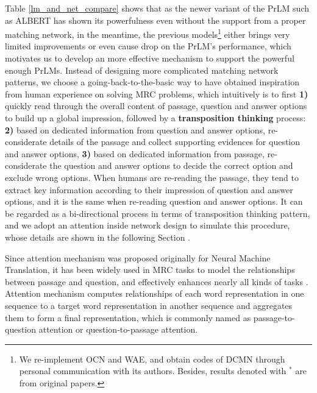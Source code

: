 \documentclass[letterpaper]{article} \usepackage{aaai21}  \usepackage{times}  \usepackage{helvet} \usepackage{courier}  \usepackage[hyphens]{url}  \usepackage{graphicx} \urlstyle{rm} \def\UrlFont{\rm}  \usepackage{natbib}  \usepackage{caption} \frenchspacing  \setlength{\pdfpagewidth}{8.5in}  \setlength{\pdfpageheight}{11in}
\begin{document}
Table \ref{lm_and_net_compare} shows that as the newer variant of the PrLM such as ALBERT \cite{albert} has shown its powerfulness even without the support from a proper matching network, in the meantime, the previous models\footnote{We re-implement OCN and WAE, and obtain codes of DCMN through personal communication with its authors. Besides, results denoted with $^*$ are from original papers.} \cite{ocn, bert_wae, dcmn} either brings very limited improvements or even cause drop on the PrLM's \cite{bert, xlnet, albert, clark2020electra} performance, which motivates us to develop an more effective mechanism to support the powerful enough PrLMs. Instead of designing more complicated matching network patterns, we choose a going-back-to-the-basic way to have obtained inspiration from human experience on solving MRC problems, which intuitively is to first \textbf{1)} quickly read through the overall content of passage, question and answer options to build up a global impression, followed by a \textbf{transposition thinking} process: \textbf{2)} based on dedicated information from question and answer options, re-considerate details of the passage and collect supporting evidences for question and answer options, \textbf{3)} based on dedicated information from passage, re-considerate the question and answer options to decide the correct option and exclude wrong options. When humans are re-reading the passage, they tend to extract key information according to their impression of question and answer options, and it is the same when re-reading question and answer options. It can be regarded as a bi-directional process in terms of transposition thinking pattern, and we adopt an attention inside network design to simulate this procedure, whose details are shown in the following Section \textit{}.

Since attention mechanism was proposed \cite{nmt_attention} originally for Neural Machine Translation, it has been widely used in MRC tasks to model the relationships between passage and question, and effectively enhances nearly all kinds of tasks \cite{bidaf,dua,dcmn}. Attention mechanism computes relationships of each word representation in one sequence to a target word representation in another sequence and aggregates them to form a final representation, which is commonly named as passage-to-question attention or question-to-passage attention.
\end{document}

